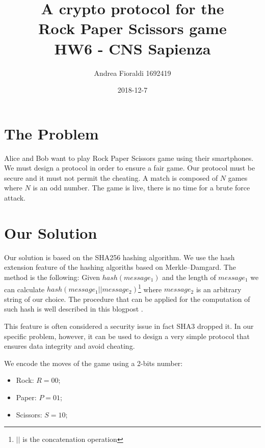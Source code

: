 \documentclass[11pt]{article}
\title{{\bf A crypto protocol for the\\Rock Paper Scissors game} \\ \bigskip \large HW6 - CNS Sapienza}
\date{2018-12-7}
\author{Andrea Fioraldi 1692419}
\begin{document}
\maketitle

\section{The Problem}

Alice and Bob want to play Rock Paper Scissors game using their smartphones.
We must design a protocol in order to ensure a fair game.
Our protocol must be secure and it must not permit the cheating.
A match is composed of $N$ games where $N$ is an odd number.
The game is live, there is no time for a brute force attack.

\section{Our Solution}

Our solution is based on the SHA256 hashing algorithm.
We use the hash extension feature of the hashing algoriths based on Merkle–Damgard.
The method is the following:
Given $hash(message_1)$ and the length of $message_1$ we can calculate $hash(message_1 || message_2)$\footnote{$||$ is the concatenation operation} where $message_2$ is an arbitrary string of our choice.
The procedure that can be applied for the computation of such hash is well described in this blogpost \cite{blog}.

This feature is often considered a security issue in fact SHA3 dropped it.
In our specific problem, however, it can be used to design a very simple protocol that ensures data integrity and avoid cheating.

We encode the moves of the game using a 2-bits number:
\begin{itemize}
    \item Rock: $R = 00$;
    \item Paper: $P = 01$;
    \item Scissors: $S = 10$;
\end{itemize}
\end{document}
